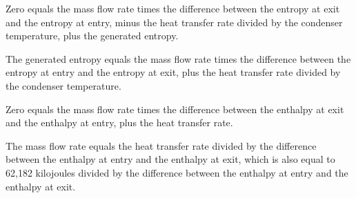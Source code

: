 Zero equals the mass flow rate times the difference between the entropy at exit and the entropy at entry, minus the heat transfer rate divided by the condenser temperature, plus the generated entropy.

The generated entropy equals the mass flow rate times the difference between the entropy at entry and the entropy at exit, plus the heat transfer rate divided by the condenser temperature.

Zero equals the mass flow rate times the difference between the enthalpy at exit and the enthalpy at entry, plus the heat transfer rate.

The mass flow rate equals the heat transfer rate divided by the difference between the enthalpy at entry and the enthalpy at exit, which is also equal to 62,182 kilojoules divided by the difference between the enthalpy at entry and the enthalpy at exit.